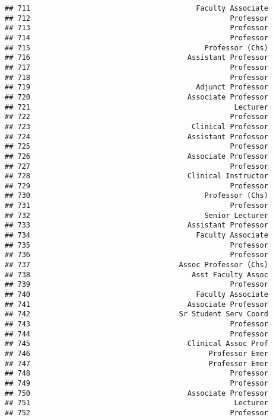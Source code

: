 \documentclass[
]{article}
\begin{document}
\begin{verbatim}
## 711                                       Faculty Associate
## 712                                               Professor
## 713                                               Professor
## 714                                               Professor
## 715                                         Professor (Chs)
## 716                                     Assistant Professor
## 717                                               Professor
## 718                                               Professor
## 719                                       Adjunct Professor
## 720                                     Associate Professor
## 721                                                Lecturer
## 722                                               Professor
## 723                                      Clinical Professor
## 724                                     Assistant Professor
## 725                                               Professor
## 726                                     Associate Professor
## 727                                               Professor
## 728                                     Clinical Instructor
## 729                                               Professor
## 730                                         Professor (Chs)
## 731                                               Professor
## 732                                         Senior Lecturer
## 733                                     Assistant Professor
## 734                                       Faculty Associate
## 735                                               Professor
## 736                                               Professor
## 737                                   Assoc Professor (Chs)
## 738                                      Asst Faculty Assoc
## 739                                               Professor
## 740                                       Faculty Associate
## 741                                     Associate Professor
## 742                                   Sr Student Serv Coord
## 743                                               Professor
## 744                                               Professor
## 745                                     Clinical Assoc Prof
## 746                                          Professor Emer
## 747                                          Professor Emer
## 748                                               Professor
## 749                                               Professor
## 750                                     Associate Professor
## 751                                                Lecturer
## 752                                               Professor

\end{verbatim}
\end{document}
